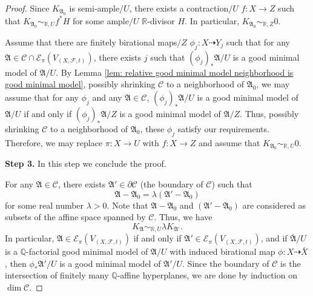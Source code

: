 \documentclass[12pt]{amsart}
\numberwithin{equation}{section}
\newcommand{\Rr}{\mathbb{R}}
\newcommand{\Aa}{{\mathfrak{A}}}
\newcommand{\Ff}{\mathcal{F}}
\theoremstyle{definition}
\theoremstyle{definition}
\theoremstyle{definition}
\begin{document}
\begin{proof}
Since $K_{\Aa_0}$ is semi-ample$/U$, there exists a contraction$/U$ $f: X\rightarrow Z$ such that $K_{\Aa_0}\sim_{\mathbb R,U}f^*H$ for some ample$/U$ $\Rr$-divisor $H$. In particular, $K_{\Aa_0}\sim_{\mathbb R,Z}0$.

Assume that there are finitely birational maps$/Z$ $\phi_j: X\dashrightarrow Y_j$ such that for any $\Aa\in\mathcal{C}\cap\mathcal{E}_{\pi}(V_{(X,\Ff,t)})$, there exists $j$ such that $(\phi_j)_*\Aa/U$ is a good minimal model of $\Aa/U$. By Lemma \ref{lem: relative good minimal model neighborhood is good minimal model}, possibly shrinking $\mathcal{C}$ to a neighborhood of $\Aa_0$, we may assume that for any $\phi_j$ and any $\Aa\in\mathcal{C}$, $(\phi_j)_*\Aa/U$ is a good minimal model of $\Aa/U$ if and only if $(\phi_j)_*\Aa/Z$ is a good minimal model of $\Aa/Z$. Thus, possibly shrinking $\mathcal{C}$ to a neighborhood of $\Aa_0$, these $\phi_j$ satisfy our requirements. Therefore, we may replace $\pi: X\rightarrow U$ with $f\colon X\rightarrow Z$ and assume that $K_{\Aa_0}\sim_{\mathbb R,U}0$.

\medskip

\noindent\textbf{Step 3.} In this step we conclude the proof. 

For any $\Aa\in\mathcal{C}$, there exists $\Aa'\in\partial\mathcal{C}$ (the boundary of $\mathcal{C}$) such that
$$\Aa-\Aa_0=\lambda (\Aa'-\Aa_0)$$
for some real number $\lambda>0$. Note that $\Aa-\Aa_0$ and $(\Aa'-\Aa_0)$ are considered as subsets of the affine space spanned by $\mathcal C$.
Thus, we have
$$K_{\Aa}\sim_{\mathbb R,U}\lambda K_{\Aa'}.$$
In particular, $\Aa\in\mathcal{E}_{\pi}(V_{(X,\Ff,t)})$ if and only if $\Aa'\in\mathcal{E}_{\pi}(V_{(X,\Ff,t)})$, and if $\bar\Aa/U$ is a $\mathbb Q$-factorial good minimal model of $\Aa/U$ with induced birational map $\phi: X\dashrightarrow\bar X$, then $\phi_*\Aa'/U$ is a good minimal model of $\Aa'/U$. Since the boundary of $\mathcal{C}$ is the intersection of finitely many $\mathbb Q$-affine hyperplanes,
we are done by induction on $\dim\mathcal{C}$.
\end{proof}
\end{document}
